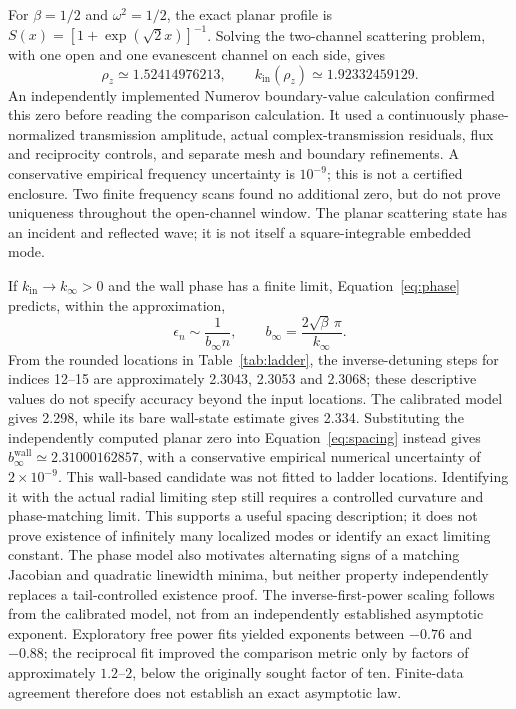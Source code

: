 \documentclass[a4paper,11pt]{article}
\begin{document}
For $\beta=1/2$ and $\omega^2=1/2$, the exact planar profile is
$S(x)=[1+\exp(\sqrt2 x)]^{-1}$. Solving the two-channel scattering
problem, with one open and one evanescent channel on each side, gives
\begin{equation}\label{eq:planarzero}
\rho_z\simeq1.52414976213,\qquad
k_{\mathrm{in}}(\rho_z)\simeq1.92332459129.
\end{equation}
An independently implemented Numerov boundary-value calculation confirmed
this zero before reading the comparison calculation. It used a continuously
phase-normalized transmission amplitude, actual complex-transmission
residuals, flux and reciprocity controls, and separate mesh and boundary
refinements. A conservative empirical frequency uncertainty is $10^{-9}$;
this is not a certified enclosure. Two finite frequency scans found no
additional zero, but do not prove uniqueness throughout the open-channel
window. The planar scattering state has an incident and reflected wave;
it is not itself a square-integrable embedded mode.

If $k_{\mathrm{in}}\to k_\infty>0$ and the wall phase has a finite limit,
Equation~\eqref{eq:phase} predicts, within the approximation,
\begin{equation}\label{eq:spacing}
\epsilon_n\sim\frac1{b_\infty n},\qquad
b_\infty=\frac{2\sqrt\beta\,\pi}{k_\infty}.
\end{equation}
From the rounded locations in Table~\ref{tab:ladder}, the inverse-detuning
steps for indices 12--15 are approximately 2.3043, 2.3053 and 2.3068;
these descriptive values do not specify accuracy beyond the input locations.
The calibrated model gives 2.298, while its bare
wall-state estimate gives 2.334. Substituting the independently computed
planar zero into Equation~\eqref{eq:spacing} instead gives
$b_\infty^{\mathrm{wall}}\simeq2.31000162857$, with a conservative empirical
numerical uncertainty of $2\times10^{-9}$. This wall-based candidate was not
fitted to ladder locations. Identifying it with the actual radial limiting
step still requires a controlled curvature and phase-matching limit.
This supports a useful spacing description;
it does not prove existence of infinitely many localized modes or identify
an exact limiting constant. The phase model also motivates alternating
signs of a matching Jacobian and quadratic linewidth minima, but neither
property independently replaces a tail-controlled existence proof.
The inverse-first-power scaling follows from the calibrated model, not
from an independently established asymptotic exponent. Exploratory free
power fits yielded exponents between $-0.76$ and $-0.88$; the reciprocal
fit improved the comparison metric only by factors of approximately
$1.2$--$2$, below the originally sought factor of ten. Finite-data agreement
therefore does not establish an exact asymptotic law.
\end{document}

